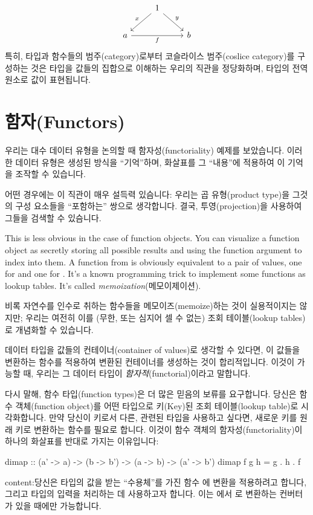 \documentclass[DaoFP]{subfiles}
\begin{document}
 \[
 \begin{tikzcd}
& 1
 \arrow[rd, "y"]
 \arrow[ld, "x"']
 \\
a
\arrow[rr, "f"']
&& b
  \end{tikzcd}
\]
특히, 타입과 함수들의 범주(category)로부터 코슬라이스 범주(coslice category)를 구성하는 것은 타입을 값들의 집합으로 이해하는 우리의 직관을 정당화하며, 타입의 전역 원소로 값이 표현됩니다.

\section{함자(Functors)}

우리는 대수 데이터 유형을 논의할 때 함자성(functoriality) 예제를 보았습니다. 이러한 데이터 유형은 생성된 방식을 ``기억''하며, 화살표를 그 ``내용''에 적용하여 이 기억을 조작할 수 있습니다.

어떤 경우에는 이 직관이 매우 설득력 있슴니다: 우리는 곱 유형(product type)을 그것의 구성 요소들을 ``포함하는'' 쌍으로 생각합니다. 결국, 투영(projection)을 사용하여 그들을 검색할 수 있슴니다.

This is less obvious in the case of function objects. You can visualize a function object as secretly storing all possible results and using the function argument to index into them. A function from  is obviously equivalent to a pair of values, one for  and one for . It's a known programming trick to implement some functions as lookup tables. It's called \emph{memoization}(메모이제이션).

비록 자연수를 인수로 취하는 함수들을 메모이즈(memoize)하는 것이 실용적이지는 않지만; 우리는 여전히 이를 (무한, 또는 심지어 셀 수 없는) 조회 테이블(lookup tables)로 개념화할 수 있습니다.

데이터 타입을 값들의 컨테이너(container of values)로 생각할 수 있다면, 이 값들을 변환하는 함수를 적용하여 변환된 컨테이너를 생성하는 것이 합리적입니다. 이것이 가능할 때, 우리는 그 데이터 타입이 \emph{함자적}(functorial)이라고 말합니다.

다시 말해, 함수 타입(function types)은 더 많은 믿음의 보류를 요구합니다. 당신은 함수 객체(function object)를 어떤 타입으로 키(Key)된 조회 테이블(lookup table)로 시각화합니다. 만약 당신이 키로서 다른, 관련된 타입을 사용하고 싶다면, 새로운 키를 원래 키로 변환하는 함수를 필요로 합니다. 이것이 함수 객체의 함자성(functoriality)이 하나의 화살표를 반대로 가지는 이유입니다:
\begin{haskell}
dimap :: (a' -> a) -> (b -> b') -> (a -> b) -> (a' -> b')
dimap f g h = g . h . f
\end{haskell}
content:당신은  타입의 값을 받는 ``수용체''를 가진 함수 에 변환을 적용하려고 합니다, 그리고  타입의 입력을 처리하는 데 사용하고자 합니다. 이는 에서 로 변환하는  컨버터가 있을 때에만 가능합니다.
\end{document}

